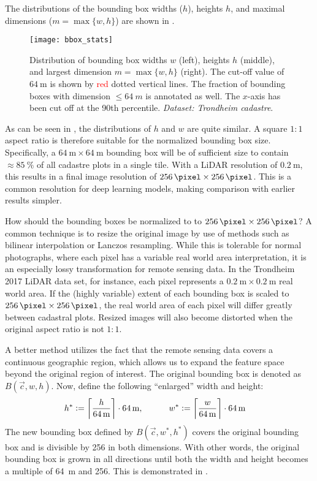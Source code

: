 The distributions of the bounding box widths ($h$), heights $h$, and maximal dimensions ($m = \max \{w, h\}$) are shown in .

\begin{figure}[htb]
  \texttt{[image: bbox\_stats]}
  \caption{
    Distribution of bounding box widths $w$ (left), heights $h$ (middle), and largest dimension $m = \max \{w, h\}$ (right).
    The cut-off value of $\SI{64}{\meter}$ is shown by \textcolor{red}{red} dotted vertical lines.
    The fraction of bounding boxes with dimension $\leq \SI{64}{m}$ is annotated as well.
    The $x$-axis has been cut off at the 90th percentile.
    \textit{Dataset: Trondheim cadastre}.
  }
  \label{fig:bbox-stats}
\end{figure}

As can be seen in , the distributions of $h$ and $w$ are quite similar.
A square $1:1$ aspect ratio is therefore suitable for the normalized bounding box size.
Specifically, a $\SI{64}{\meter} \times \SI{64}{\meter}$ bounding box will be of sufficient size to contain $\approx \SI{85}{\percent}$ of all cadastre plots in a single tile.
With a LiDAR resolution of $\SI{0.2}{\meter}$, this results in a final image resolution of $\SI{256}{\pixel} \times \SI{256}{\pixel}$.
This is a common resolution for deep learning models, making comparison with earlier results simpler.

How should the bounding boxes be normalized to to $\SI{256}{\pixel} \times \SI{256}{\pixel}$?
A common technique is to resize the original image by use of methods such as bilinear interpolation or Lanczos resampling.
While this is tolerable for normal photographs, where each pixel has a variable real world area interpretation, it is an especially lossy transformation for remote sensing data.
In the Trondheim 2017 LiDAR data set, for instance, each pixel represents a $\SI{0.2}{\meter} \times \SI{0.2}{\meter}$ real world area.
If the (highly variable) extent of each bounding box is scaled to $\SI{256}{\pixel} \times \SI{256}{\pixel}$, the real world area of each pixel will differ greatly between cadastral plots.
Resized images will also become distorted when the original aspect ratio is not $1:1$.

A better method utilizes the fact that the remote sensing data covers a continuous geographic region, which allows us to expand the feature space beyond the original region of interest.
The original bounding box is denoted as $B(\vec{c}, w, h)$.
Now, define the following \enquote{enlarged} width and height:
%
\begin{align*}
  h^* &:= \left\lceil \frac{h}{\SI{64}{\meter}} \right\rceil \cdot \SI{64}{\meter},
  \hspace{3em}
  w^* := \left\lceil \frac{w}{\SI{64}{\meter}} \right\rceil \cdot \SI{64}{\meter}
\end{align*}
%
The new bounding box defined by $B(\vec{c}, w^*, h^*)$ covers the original bounding box and is divisible by \SI{256}{\pixel} in both dimensions.
With other words, the original bounding box is grown in all directions until both the width and height becomes a multiple of \SI{64}{\meter} and \SI{256}{\pixel}.
This is demonstrated in .

